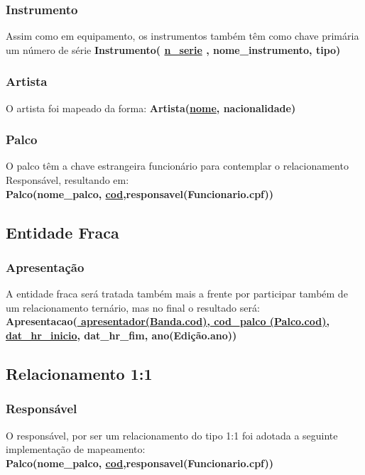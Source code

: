 \documentclass[12pt]{article}
\begin{document}
\subsubsection{Instrumento}
Assim como em equipamento, os instrumentos também têm como chave primária um número de série	
\textbf{Instrumento( \underline{n\_serie} , nome\_instrumento, tipo)}

\subsubsection{Artista}
O artista foi mapeado da forma: \textbf{Artista(\underline{nome}, nacionalidade)}

\subsubsection{Palco}
O palco têm a chave estrangeira funcionário para contemplar o relacionamento Responsável, resultando em: \\
\textbf{Palco(nome\_palco, \underline{cod},responsavel(Funcionario.cpf))}

\subsection{Entidade Fraca}

\subsubsection{Apresentação}
A entidade fraca será tratada também mais a frente por participar também de um relacionamento ternário, mas no final o resultado será: \\
\textbf{Apresentacao(\underline{  apresentador(Banda.cod), cod\_palco (Palco.cod), dat\_hr\_inicio}, dat\_hr\_fim, ano(Edição.ano))}

\subsection{Relacionamento 1:1}	
\subsubsection{Responsável}
O responsável, por ser um relacionamento do tipo 1:1 foi adotada a seguinte implementação de mapeamento:\\

\textbf{Palco(nome\_palco, \underline{cod},responsavel(Funcionario.cpf))}\\
\end{document}
